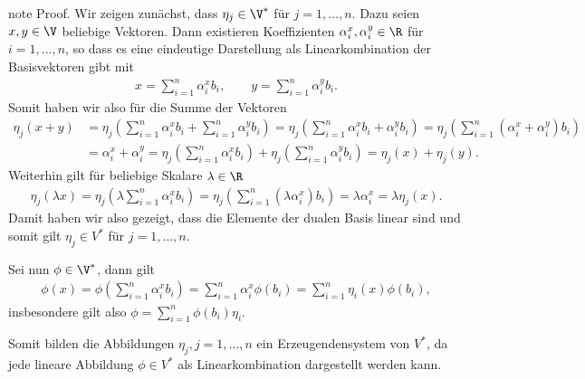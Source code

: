 \documentclass[letterpaper,10pt,english]{jupyterBook}
\begin{document}
\begin{sphinxadmonition}{note}
\sphinxAtStartPar
Proof. Wir zeigen zunächst, dass \(\eta_j\in\V^\ast\) für \(j=1,\ldots,n\).
Dazu seien \(x,y\in\V\) beliebige Vektoren.
Dann existieren Koeffizienten \(\alpha_i^x,\alpha_i^y \in \R\) für \(i=1,\ldots,n\), so dass es eine eindeutige Darstellung als Linearkombination der Basisvektoren gibt mit
\begin{equation*}
\begin{split}x = \sum_{i=1}^n \alpha_i^x b_i, \qquad y = \sum_{i=1}^n \alpha_i^y b_i.\end{split}
\end{equation*}
\sphinxAtStartPar
Somit haben wir also für die Summe der Vektoren
\begin{equation*}
\begin{split}\eta_j(x+y) &= 
\eta_j\left(\sum_{i=1}^n \alpha_i^x b_i + \sum_{i=1}^n \alpha_i^y b_i\right) = 
\eta_j\left(\sum_{i=1}^n \alpha_i^x b_i + \alpha_i^y b_i\right) = 
\eta_j\left(\sum_{i=1}^n (\alpha_i^x + \alpha_i^y) b_i\right) 
\\&= \alpha_i^x + \alpha_i^y = 
\eta_j\left(\sum_{i=1}^n \alpha_i^x b_i\right)  + \eta_j\left(\sum_{i=1}^n \alpha_i^y b_i\right) = 
\eta_j(x) + \eta_j(y).\end{split}
\end{equation*}
\sphinxAtStartPar
Weiterhin gilt für beliebige Skalare \(\lambda\in\R\)
\begin{equation*}
\begin{split}\eta_j(\lambda x) = \eta_j\left(\lambda \sum_{i=1}^n \alpha_i^x b_i\right) = 
\eta_j\left(\sum_{i=1}^n (\lambda \alpha_i^x) b_i\right) =
\lambda \alpha_i^x =
\lambda \eta_j(x).\end{split}
\end{equation*}
\sphinxAtStartPar
Damit haben wir also gezeigt, dass die Elemente der dualen Basis linear sind und somit gilt \(\eta_j \in V^\ast\) für \(j=1,\ldots,n\).

\sphinxAtStartPar
Sei nun \(\phi\in \V^\ast\), dann gilt
\begin{equation*}
\begin{split}\phi(x) = \phi\left(\sum_{i=1}^n \alpha_i^x b_i\right) = \sum_{i=1}^n \alpha_i^x \phi(b_i) = 
\sum_{i=1}^n \eta_i(x) \phi(b_i),\end{split}
\end{equation*}
\sphinxAtStartPar
insbesondere gilt also \(\phi = \sum_{i=1}^n \phi(b_i) \eta_i\).

\sphinxAtStartPar
Somit bilden die Abbildungen \(\eta_j, j=1,\ldots, n\) ein Erzeugendensystem von \(V^\ast\), da jede lineare Abbildung \(\phi \in V^\ast\) als Linearkombination dargestellt werden kann.


\end{sphinxadmonition}
\end{document}
